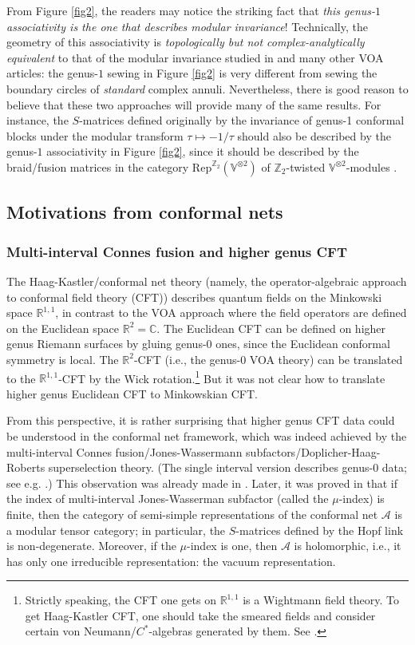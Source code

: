 \documentclass[11pt,b5paper,notitlepage]{article}
\theoremstyle{definition}
\theoremstyle{plain}
\newcommand{\mc}{\mathcal}
\newcommand{\Rep}{\mathrm{Rep}}
\newcommand{\Vbb}{\mathbb V}
\newcommand{\Cbb}{\mathbb C}
\newcommand{\Zbb}{\mathbb Z}
\newcommand{\Rbb}{\mathbb R}
\numberwithin{equation}{subsection}
\begin{document}
From Figure \ref{fig2}, the readers may notice the striking fact that \emph{this genus-$1$ associativity is the one that describes modular invariance}! Technically, the geometry of this associativity is \emph{topologically but not complex-analytically equivalent} to that of the modular invariance studied in \cite{Zhu96,Miy04,Hua05} and many other VOA articles: the genus-$1$ sewing in Figure \ref{fig2} is very different from sewing the boundary circles of \emph{standard} complex annuli. Nevertheless, there is good reason to believe that these two approaches will provide many of the same results. For instance, the $S$-matrices  defined originally by the invariance of genus-1 conformal blocks under the modular transform $\tau\mapsto -1/\tau$ should also be described by the genus-$1$ associativity in Figure \ref{fig2}, since it should be described by the braid/fusion matrices in the category $\Rep^{\Zbb_2}(\Vbb^{\otimes 2})$ of $\Zbb_2$-twisted $\Vbb^{\otimes 2}$-modules \cite{LX19}.


\subsection{Motivations from conformal nets}


\subsubsection*{Multi-interval Connes fusion and higher genus CFT}

The Haag-Kastler/conformal net theory (namely, the operator-algebraic approach to conformal field theory (CFT)) describes quantum fields on the Minkowski space $\Rbb^{1,1}$,  in contrast to the VOA approach where the field operators are defined on the Euclidean space $\Rbb^2=\Cbb$. The Euclidean CFT can be defined on higher genus Riemann surfaces by gluing genus-$0$ ones, since the Euclidean conformal symmetry is local.  The $\Rbb^2$-CFT (i.e., the genus-$0$ VOA theory) can be translated to the $\Rbb^{1,1}$-CFT by the Wick rotation.\footnote{Strictly speaking, the CFT one gets on $\Rbb^{1,1}$ is a Wightmann field theory. To get   Haag-Kastler CFT, one should take the smeared fields and consider certain von Neumann/$C^*$-algebras generated by them. See \cite{CKLW18}.} But it was not clear how to translate higher genus Euclidean CFT to Minkowskian CFT.


From this perspective, it is rather surprising that higher genus CFT data could be understood in the conformal net framework, which was indeed achieved by the multi-interval Connes fusion/Jones-Wassermann subfactors/Doplicher-Haag-Roberts superselection theory. (The single interval version describes genus-$0$ data; see e.g. \cite{FRS89,FRS92,Was98}.)  This observation was already made in \cite{Was94}. Later, it was proved in  \cite{KLM01,LX04} that if the index of multi-interval Jones-Wasserman subfactor (called the $\mu$-index) is finite, then the  category of semi-simple representations of the conformal net $\mc A$ is a modular tensor category; in particular, the $S$-matrices defined by the Hopf link is non-degenerate. Moreover, if the $\mu$-index is one, then $\mc A$ is holomorphic, i.e., it has only one irreducible representation: the vacuum representation.
\end{document}
